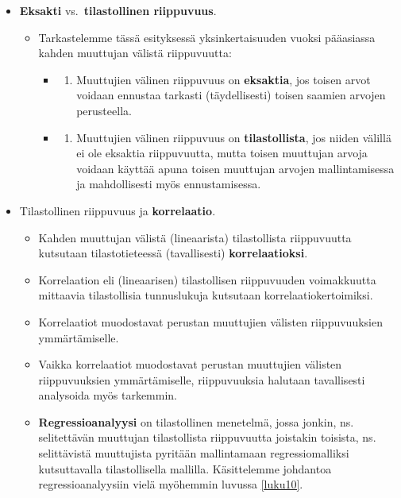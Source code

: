 \documentclass[
]{book}
\providecommand{\tightlist}{%
  \setlength{\itemsep}{0pt}\setlength{\parskip}{0pt}}
\begin{document}
\begin{itemize}
\tightlist
\item
  \textbf{Eksakti} vs.~\textbf{tilastollinen riippuvuus}.

  \begin{itemize}
  \tightlist
  \item
    Tarkastelemme tässä esityksessä yksinkertaisuuden vuoksi pääasiassa kahden muuttujan välistä riippuvuutta:

    \begin{itemize}
    \item
      \begin{enumerate}
      \def\labelenumi{(\roman{enumi})}
      \tightlist
      \item
        Muuttujien välinen riippuvuus on \textbf{eksaktia}, jos toisen arvot voidaan ennustaa tarkasti (täydellisesti) toisen saamien arvojen perusteella.
      \end{enumerate}
    \item
      \begin{enumerate}
      \def\labelenumi{(\roman{enumi})}
      \setcounter{enumi}{1}
      \tightlist
      \item
        Muuttujien välinen riippuvuus on \textbf{tilastollista}, jos niiden välillä ei ole eksaktia riippuvuutta, mutta toisen muuttujan arvoja voidaan käyttää apuna toisen muuttujan arvojen mallintamisessa ja mahdollisesti myös ennustamisessa.
      \end{enumerate}
    \end{itemize}
  \end{itemize}
\item
  Tilastollinen riippuvuus ja \textbf{korrelaatio}.

  \begin{itemize}
  \tightlist
  \item
    Kahden muuttujan välistä (lineaarista) tilastollista riippuvuutta kutsutaan tilastotieteessä (tavallisesti) \textbf{korrelaatioksi}.
  \item
    Korrelaation eli (lineaarisen) tilastollisen riippuvuuden voimakkuutta mittaavia tilastollisia tunnuslukuja kutsutaan korrelaatiokertoimiksi.
  \item
    Korrelaatiot muodostavat perustan muuttujien välisten riippuvuuksien ymmärtämiselle.
  \item
    Vaikka korrelaatiot muodostavat perustan muuttujien välisten riippuvuuksien ymmärtämiselle, riippuvuuksia halutaan tavallisesti analysoida myös tarkemmin.
  \item
    \textbf{Regressioanalyysi} on tilastollinen menetelmä, jossa jonkin, ns. selitettävän muuttujan tilastollista riippuvuutta joistakin toisista, ns. selittävistä muuttujista pyritään mallintamaan regressiomalliksi kutsuttavalla tilastollisella mallilla. Käsittelemme johdantoa regressioanalyysiin vielä myöhemmin luvussa \ref{luku10}.
  \end{itemize}
\end{itemize}
\end{document}
